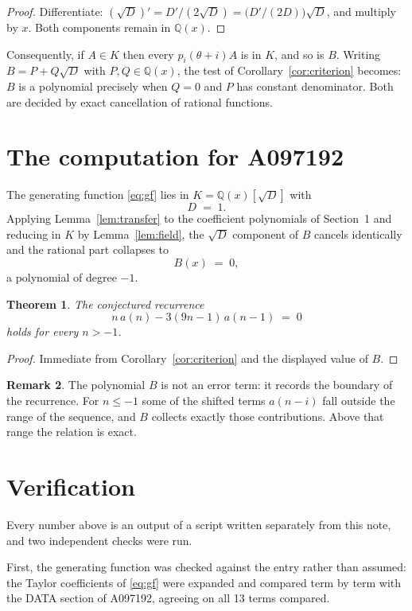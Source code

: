 \documentclass[11pt,a4paper]{article}
\theoremstyle{plain}
\newtheorem{theorem}{Theorem}
\theoremstyle{definition}
\newtheorem{remark}[theorem]{Remark}
\begin{document}
\begin{proof}
Differentiate: $(\sqrt{D})'=D'/(2\sqrt{D})=\bigl(D'/(2D)\bigr)\sqrt{D}$, and multiply by
$x$. Both components remain in $\mathbb{Q}(x)$.
\end{proof}

Consequently, if $A\in K$ then every $p_{i}(\theta+i)A$ is in $K$, and so is $B$. Writing
$B=P+Q\sqrt{D}$ with $P,Q\in\mathbb{Q}(x)$, the test of Corollary~\ref{cor:criterion}
becomes: $B$ is a polynomial precisely when $Q=0$ and $P$ has constant denominator. Both
are decided by exact cancellation of rational functions.

\section{The computation for A097192}

The generating function \eqref{eq:gf} lies in $K=\mathbb{Q}(x)[\sqrt{D}]$ with
\[
D \;=\; 1 .
\]
Applying Lemma~\ref{lem:transfer} to the coefficient polynomials of Section~1 and reducing
in $K$ by Lemma~\ref{lem:field}, the $\sqrt{D}$ component of $B$ cancels identically and
the rational part collapses to
\[
B(x)\;=\;0 ,
\]
a polynomial of degree $-1$.

\begin{theorem}
The conjectured recurrence
\[
n\,a(n) -  3 \left(9 n - 1\right)\,a(n-1) \;=\;0
\]
holds for every $n>-1$.
\end{theorem}

\begin{proof}
Immediate from Corollary~\ref{cor:criterion} and the displayed value of $B$.
\end{proof}

\begin{remark}
The polynomial $B$ is not an error term: it records the boundary of the recurrence. For
$n\le-1$ some of the shifted terms $a(n-i)$ fall outside the range of the sequence,
and $B$ collects exactly those contributions. Above that range the relation is exact.
\end{remark}

\section{Verification}

Every number above is an output of a script written separately from this note, and two
independent checks were run.

First, the generating function was checked against the entry rather than assumed: the
Taylor coefficients of \eqref{eq:gf} were expanded and compared term by term with the DATA
section of A097192, agreeing on all 13 terms compared.
\end{document}
